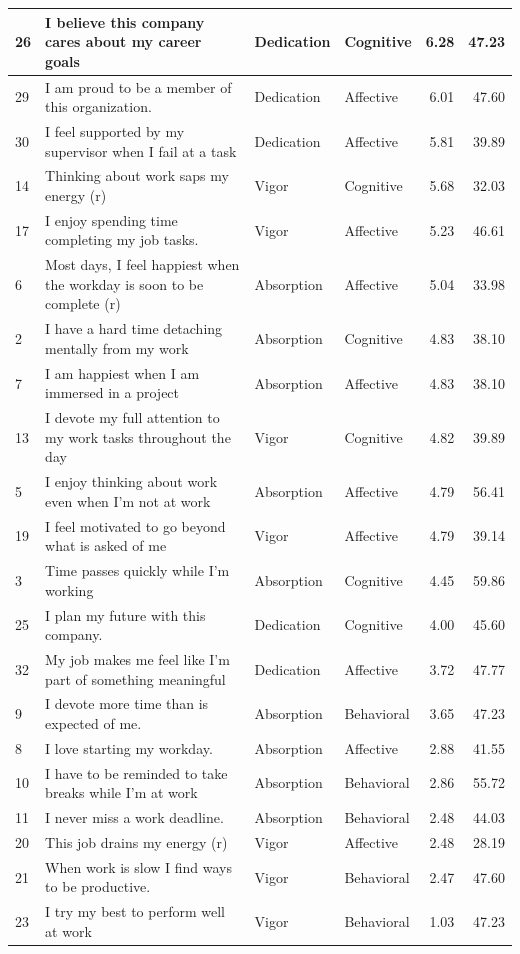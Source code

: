 \documentclass[
]{book}
\begin{document}
\begin{table}
\begin{tabular}[t]{l|l|l|l|r|r}
\hline
26 & I believe this company cares about my career goals & Dedication & Cognitive & 6.28 & 47.23\\
\hline
29 & I am proud to be a member of this organization. & Dedication & Affective & 6.01 & 47.60\\
\hline
30 & I feel supported by my supervisor when I fail at a task & Dedication & Affective & 5.81 & 39.89\\
\hline
14 & Thinking about work saps my energy (r) & Vigor & Cognitive & 5.68 & 32.03\\
\hline
17 & I enjoy spending time completing my job tasks. & Vigor & Affective & 5.23 & 46.61\\
\hline
6 & Most days, I feel happiest when the workday is soon to be complete (r) & Absorption & Affective & 5.04 & 33.98\\
\hline
2 & I have a hard time detaching mentally from my work & Absorption & Cognitive & 4.83 & 38.10\\
\hline
7 & I am happiest when I am immersed in a project & Absorption & Affective & 4.83 & 38.10\\
\hline
13 & I devote my full attention to my work tasks throughout the day & Vigor & Cognitive & 4.82 & 39.89\\
\hline
5 & I enjoy thinking about work even when I’m not at work & Absorption & Affective & 4.79 & 56.41\\
\hline
19 & I feel motivated to go beyond what is asked of me & Vigor & Affective & 4.79 & 39.14\\
\hline
3 & Time passes quickly while I’m working & Absorption & Cognitive & 4.45 & 59.86\\
\hline
25 & I plan my future with this company. & Dedication & Cognitive & 4.00 & 45.60\\
\hline
32 & My job makes me feel like I’m part of something meaningful & Dedication & Affective & 3.72 & 47.77\\
\hline
9 & I devote more time than is expected of me. & Absorption & Behavioral & 3.65 & 47.23\\
\hline
8 & I love starting my workday. & Absorption & Affective & 2.88 & 41.55\\
\hline
10 & I have to be reminded to take breaks while I’m at work & Absorption & Behavioral & 2.86 & 55.72\\
\hline
11 & I never miss a work deadline. & Absorption & Behavioral & 2.48 & 44.03\\
\hline
20 & This job drains my energy (r) & Vigor & Affective & 2.48 & 28.19\\
\hline
21 & When work is slow I find ways to be productive. & Vigor & Behavioral & 2.47 & 47.60\\
\hline
23 & I try my best to perform well at work & Vigor & Behavioral & 1.03 & 47.23\\
\hline
\end{tabular}
\end{table}
\end{document}
